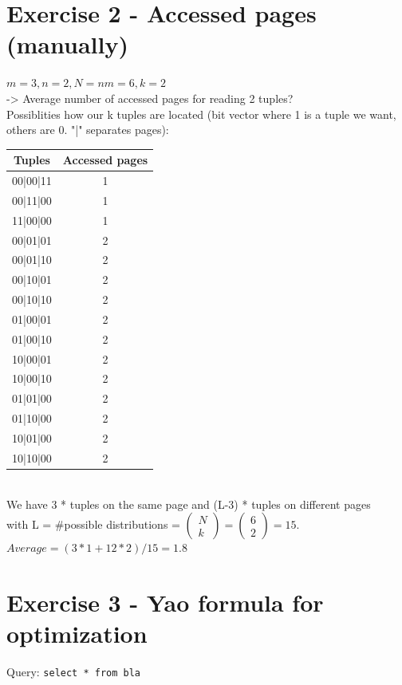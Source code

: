 \documentclass[11pt,a4paper]{scrartcl}
\begin{document}
\section*{Exercise 2 - Accessed pages (manually)}
$m = 3, n = 2, N = nm = 6, k = 2$\\
-> Average number of accessed pages for reading 2 tuples?\\
Possiblities how our k tuples are located (bit vector where 1 is a tuple we want, others are 0. "|" separates pages):\\
\begin{tabular}{|c|c|}
\hline
Tuples & Accessed pages\\
\hline
00|00|11 & 1\\
00|11|00 & 1\\
11|00|00 & 1\\
00|01|01 & 2\\
00|01|10 & 2\\
00|10|01 & 2\\
00|10|10 & 2\\
01|00|01 & 2\\
01|00|10 & 2\\
10|00|01 & 2\\
10|00|10 & 2\\
01|01|00 & 2\\
01|10|00 & 2\\
10|01|00 & 2\\
10|10|00 & 2\\
\hline
\end{tabular}\\
We have 3 * tuples on the same page and (L-3) * tuples on different pages\\
with L = \#possible distributions = $\begin{pmatrix} N \\ k \end{pmatrix} = \begin{pmatrix} 6 \\ 2 \end{pmatrix} = 15$.\\
$Average = (3*1 + 12*2)/15 = 1.8$\\

\section*{Exercise 3 - Yao formula for optimization}
Query: \verb|select * from bla|
\end{document}
